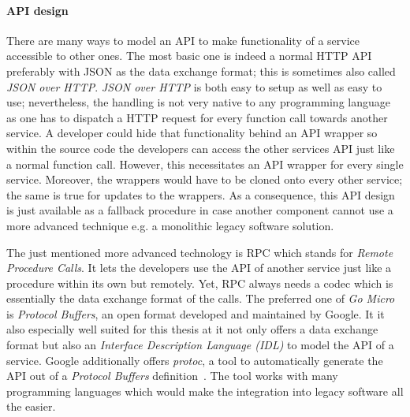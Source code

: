 \documentclass[12pt,a4paper]{report}
\begin{document}
\paragraph{API design} \label{construction-api_design}
There are many ways to model an API to make functionality of a service accessible
to other ones. The most basic one is indeed a normal HTTP API preferably with
JSON as the data exchange format; this is sometimes also called \textit{JSON over HTTP}.
\textit{JSON over HTTP} is both easy to setup as well as easy to use;
nevertheless, the handling is not very native to any programming language as one
has to dispatch a HTTP request for every function call towards another service.
A developer could hide that functionality behind an API wrapper so within the
source code the developers can access the other services API just like a normal
function call. However, this necessitates an API wrapper for every single service.
Moreover, the wrappers would have to be cloned onto every other service;
the same is true for updates to the wrappers.
As a consequence, this API design is just available as a fallback procedure
in case another component cannot use a more advanced technique e.g. a monolithic
legacy software solution.

The just mentioned more advanced technology is RPC which stands for
\textit{Remote Procedure Calls}.
It lets the developers use the API of another service just like a procedure within
its own but remotely. Yet, RPC always needs a codec which is essentially the
data exchange format of the calls. The preferred one of \textit{Go Micro}
is \textit{Protocol Buffers}, an open format developed and maintained by Google.
It it also especially well suited for this thesis at it not only offers a
data exchange format but also an \textit{Interface Description Language (IDL)}
to model the API of a service. Google additionally offers \textit{protoc},
a tool to automatically generate the API out of a \textit{Protocol Buffers}
definition~\cite{protobuf}. The tool works with many programming languages
which would make the integration into legacy software all the easier.
\end{document}
